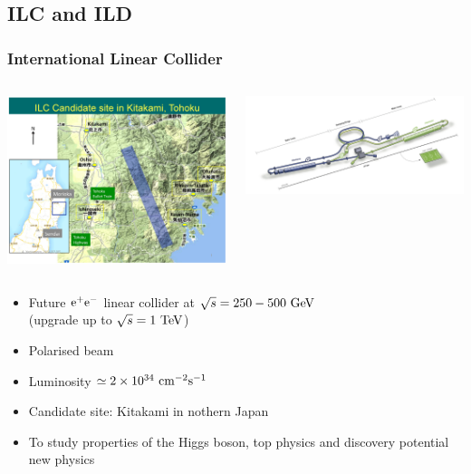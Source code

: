 \documentclass{beamer}
\begin{document}
    
    \subsection{ILC and ILD}

  \begin{frame}
    \frametitle{International Linear Collider}

    \vspace{-0.3cm}
    \begin{columns}[c]
      \begin{column}{3cm}
        \centering
        \includegraphics[width = 4 cm]{Pictures/ILC-Candidate-Area2.jpg}
      \end{column}
      \begin{column}{8cm}
        \centering
        \includegraphics[width = 9 cm]{Pictures/ILC.png}
      \end{column}
    \end{columns}

    \vspace{-0.3cm}
    \begin{itemize}
      \item Future $\rm{e}^+\rm{e}^-$ linear collider at $\sqrt{s} = 250 - 500~\rm{GeV}$ \\ (upgrade up to $\sqrt{s} = 1~\rm{TeV}$)
      \item Polarised beam
      \item Luminosity $\simeq 2 \times 10^{34}~\rm{cm}^{-2}\rm{s}^{-1}$
      \item Candidate site: Kitakami in nothern Japan
      \item To study properties of the Higgs boson, top physics and discovery potential new physics
    \end{itemize}
  \end{frame}
 
\end{document}
